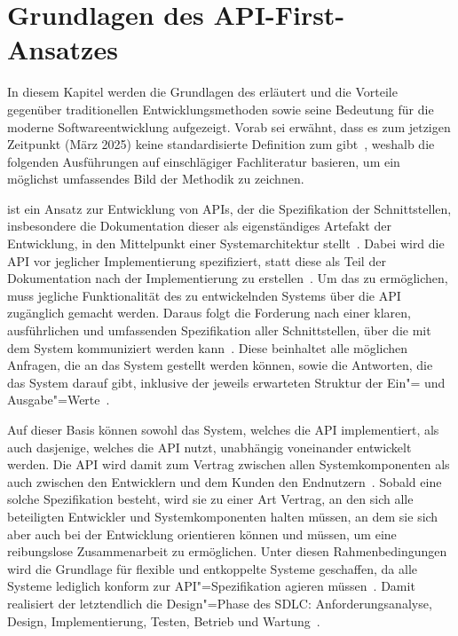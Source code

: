 \chapter{Grundlagen des API-First-Ansatzes}
In diesem Kapitel werden die Grundlagen des \AFAes erläutert und die Vorteile gegenüber traditionellen Entwicklungsmethoden sowie seine Bedeutung für die moderne Softwareentwicklung aufgezeigt.
Vorab sei erwähnt, dass es zum jetzigen Zeitpunkt (März 2025) keine standardisierte Definition zum \AFA gibt~\cite[77]{bea22}, weshalb die folgenden Ausführungen auf einschlägiger Fachliteratur basieren, um ein möglichst umfassendes Bild der Methodik zu zeichnen.

\AF ist ein Ansatz zur Entwicklung von \acp{API}, der die Spezifikation der Schnittstellen, insbesondere die Dokumentation dieser als eigenständiges Artefakt der Entwicklung, in den Mittelpunkt einer Systemarchitektur stellt~\cite[2]{kul23}.
Dabei wird die \ac{API} vor jeglicher Implementierung spezifiziert, statt diese als Teil der Dokumentation nach der Implementierung zu erstellen~\cites[1627]{cha21}[349]{de23}.
Um das zu ermöglichen, muss jegliche Funktionalität des zu entwickelnden Systems über die \ac{API} zugänglich gemacht werden.
Daraus folgt die Forderung nach einer klaren, ausführlichen und umfassenden Spezifikation aller Schnittstellen, über die mit dem System kommuniziert werden kann~\cite[75]{bea22}.
Diese beinhaltet alle möglichen Anfragen, die an das System gestellt werden können, sowie die Antworten, die das System darauf gibt, inklusive der jeweils erwarteten Struktur der Ein"= und Ausgabe"=Werte~\cite[350]{de23}.

Auf dieser Basis können sowohl das System, welches die \ac{API} implementiert, als auch dasjenige, welches die \ac{API} nutzt, unabhängig voneinander entwickelt werden.
Die \ac{API} wird damit zum Vertrag zwischen allen Systemkomponenten als auch zwischen den Entwicklern und dem Kunden \bzw den Endnutzern~\cite[1627]{cha21}.
Sobald eine solche Spezifikation besteht, wird sie zu einer Art Vertrag, an den sich alle beteiligten Entwickler und Systemkomponenten halten müssen, an dem sie sich aber auch bei der Entwicklung orientieren können und müssen, um eine reibungslose Zusammenarbeit zu ermöglichen.
Unter diesen Rahmenbedingungen wird die Grundlage für flexible und entkoppelte Systeme geschaffen, da alle Systeme lediglich konform zur \ac{API}"=Spezifikation agieren müssen~\cite[350,354,360]{de23}.
Damit realisiert der \AFA letztendlich die Design"=Phase des \ac{SDLC}: Anforderungsanalyse, Design, Implementierung, Testen, Betrieb und Wartung~\cite{vol22}.

